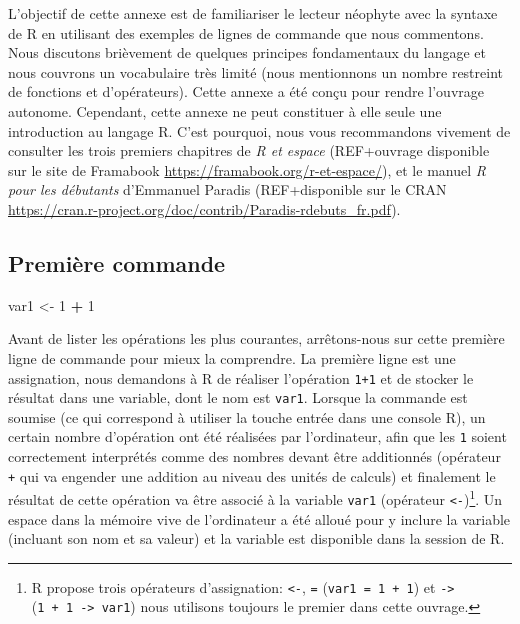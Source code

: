 \documentclass[]{article}
\newenvironment{Shaded}{\begin{snugshade}}{\end{snugshade}}
\newcommand{\DecValTok}[1]{\textcolor[rgb]{0.00,0.00,0.81}{#1}}
\newcommand{\NormalTok}[1]{#1}
\newcommand{\OperatorTok}[1]{\textcolor[rgb]{0.81,0.36,0.00}{\textbf{#1}}}
\newcommand{\StringTok}[1]{\textcolor[rgb]{0.31,0.60,0.02}{#1}}
\begin{document}
L'objectif de cette annexe est de familiariser le lecteur néophyte avec la
syntaxe de R en utilisant des exemples de lignes de commande que nous
commentons. Nous discutons brièvement de quelques principes fondamentaux du
langage et nous couvrons un vocabulaire très limité (nous mentionnons un nombre
restreint de fonctions et d'opérateurs). Cette annexe a été conçu pour rendre
l'ouvrage autonome. Cependant, cette annexe ne peut constituer à elle seule une
introduction au langage R. C'est pourquoi, nous vous recommandons vivement de
consulter les trois premiers chapitres de \emph{R et espace} (REF+ouvrage disponible
sur le site de Framabook \url{https://framabook.org/r-et-espace/}), et le manuel \emph{R
pour les débutants} d'Emmanuel Paradis (REF+disponible sur le CRAN
\url{https://cran.r-project.org/doc/contrib/Paradis-rdebuts_fr.pdf}).

\hypertarget{premiuxe8re-commande}{%
\subsection{Première commande}\label{premiuxe8re-commande}}

\begin{Shaded}
\begin{Highlighting}[]
\NormalTok{var1 <-}\StringTok{ }\DecValTok{1} \OperatorTok{+}\StringTok{ }\DecValTok{1}
\end{Highlighting}
\end{Shaded}

Avant de lister les opérations les plus courantes, arrêtons-nous sur cette
première ligne de commande pour mieux la comprendre. La première ligne est une
assignation, nous demandons à R de réaliser l'opération \texttt{1+1} et de stocker le
résultat dans une variable, dont le nom est \texttt{var1}. Lorsque la commande est
soumise (ce qui correspond à utiliser la touche entrée dans une console R), un
certain nombre d'opération ont été réalisées par l'ordinateur, afin que les
\texttt{1} soient correctement interprétés comme des nombres devant être additionnés
(opérateur \texttt{+} qui va engender une addition au niveau des unités de calculs)
et finalement le résultat de cette opération va être associé à la variable
\texttt{var1} (opérateur \texttt{\textless{}-})\footnote{R propose trois opérateurs d'assignation: \texttt{\textless{}-}, \texttt{=} (\texttt{var1\ =\ 1\ +\ 1})
  et \texttt{-\textgreater{}} (\texttt{1\ +\ 1\ -\textgreater{}\ var1}) nous utilisons toujours le premier dans cette ouvrage.}. Un espace dans la mémoire vive de l'ordinateur
a été alloué pour y inclure la variable (incluant son nom et sa valeur) et la
variable est disponible dans la session de R.
\end{document}
